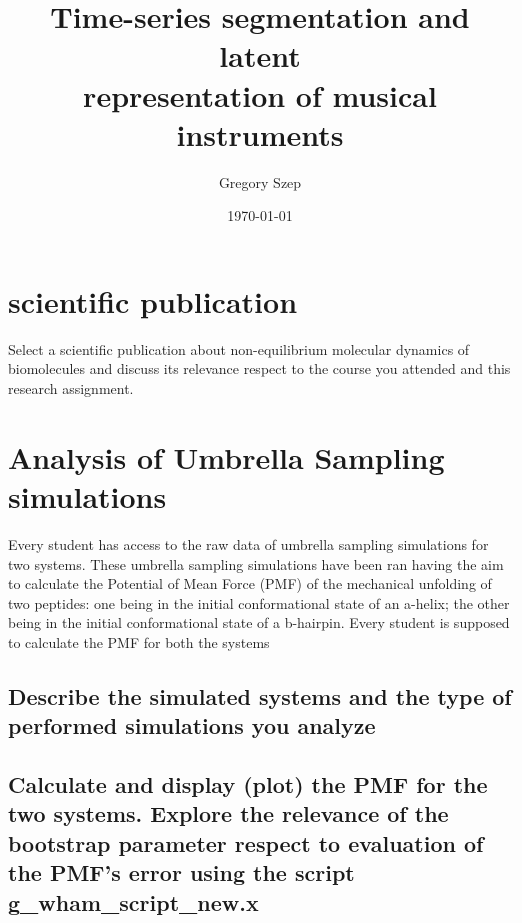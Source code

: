 \documentclass{article}[12pt]
\numberwithin{equation}{section}
\begin{document}
\title{
Time-series segmentation and latent\\ representation of musical instruments
}

\author{Gregory Szep}
\date{\today}
\maketitle

\section{scientific publication}
Select a scientific publication about non-equilibrium molecular dynamics of
biomolecules and discuss its relevance respect to the course you attended and
this research assignment.

\section{Analysis of Umbrella Sampling simulations}
Every student has access to the raw data of umbrella sampling simulations for
two systems. These umbrella sampling simulations have been ran having the
aim to calculate the Potential of Mean Force (PMF) of the mechanical unfolding
of two peptides: one being in the initial conformational state of an a-helix; the
other being in the initial conformational state of a b-hairpin. Every student is
supposed to calculate the PMF for both the systems
\subsection{Describe the simulated systems and the type of performed simulations you
analyze}
\subsection{Calculate and display (plot) the PMF for the two systems. Explore the
relevance of the bootstrap parameter respect to evaluation of the PMF’s error
using the script g_wham_script_new.x}
\end{document}
